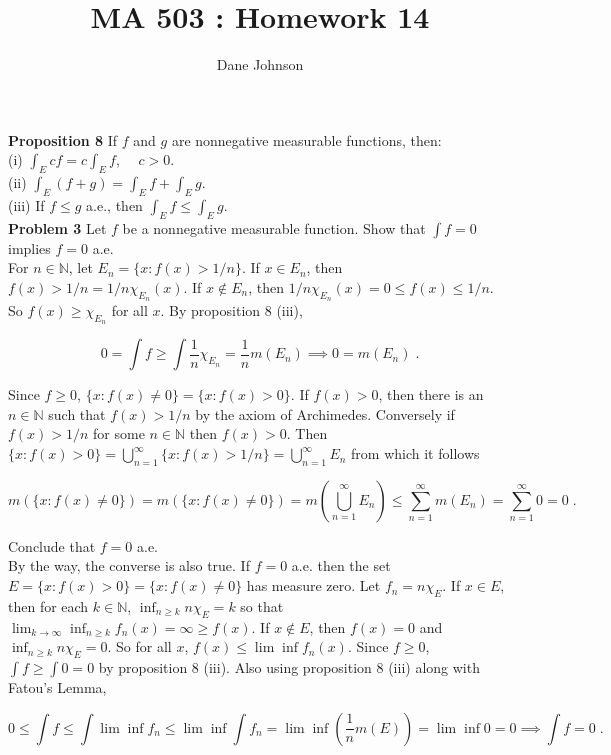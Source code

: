 \documentclass[a4paper]{article}
\title{MA 503 : Homework 14}
\author{Dane Johnson}
\begin{document}
\maketitle


{\bf Proposition 8} If $f$ and $g$ are nonnegative measurable functions, then:\\

(i)  $\int_E cf = c\int_E f$, $\quad c>0$. \\

(ii) $\int_E (f+g) = \int_E f + \int_E g$.\\

(iii) If $f \leq g$ a.e., then $\int_E f \leq \int_E g$. \\


{\bf Problem 3} Let $f$ be a nonnegative measurable function. Show that $\int f = 0$ implies $f = 0$ a.e. \\

For $n \in \mathbb{N}$, let $E_n = \{x : f(x) > 1/n\}$. If $x \in E_n$, then $f(x) > 1/n = 1/n \chi_{E_n}(x)$. If $x \not \in E_n$, then $1/n\chi_{E_n}(x)= 0  \leq f(x) \leq 1/n$. So $f(x) \geq \chi_{E_n}$ for all $x$. By proposition 8 (iii),

$$ 0 = \int f \geq \int \frac{1}{n}\chi_{E_n} = \frac{1}{n}m(E_n) \implies 0 = m(E_n) \;.$$

Since $f \geq 0$, $\{x : f(x) \neq 0 \} = \{x : f(x) > 0\}$. If $f(x) > 0$, then there is an $n\in \mathbb{N}$ such that $f(x) > 1/n$ by the axiom of Archimedes. Conversely if $f(x) > 1/n$ for some $n \in \mathbb{N}$ then $f(x) > 0 $. Then $\{x : f(x) > 0 \} = \bigcup_{n=1}^\infty \{x : f(x) > 1/n\} = \bigcup_{n=1}^\infty E_n$ from which it follows

$$m\left(\{x : f(x) \neq 0\}\right) = m\left(\{x : f(x) \neq 0\}\right) = m\left(\bigcup_{n=1}^\infty E_n \right) \leq \sum_{n=1}^\infty m(E_n)  = \sum_{n=1}^\infty 0 = 0 \;.$$

Conclude that $f = 0$ a.e.\\

By the way, the converse is also true. If $f = 0$ a.e. then the set $E = \{x : f(x) > 0 \} = \{x : f(x) \neq 0\}$ has measure zero. Let $f_n = n \chi_{E}$. If $x \in E$, then for each $k \in \mathbb{N}$, $\inf_{n\geq k} n \chi_E = k$ so that $\lim_{k\rightarrow \infty} \inf_{n\geq k} f_n(x) = \infty \geq f(x)$. If $x \not \in E$, then $f(x) = 0$ and $\inf_{n\geq k} n\chi_E = 0$. So for all $x$, $f(x) \leq \lim \inf f_n(x)$. Since $f \geq 0$, $\int f \geq \int 0 = 0$ by proposition 8 (iii). Also using proposition 8 (iii) along with Fatou's Lemma,

$$0 \leq \int f \leq \int \lim \inf f_n \leq \lim \inf \int f_n = \lim \inf \left(\frac{1}{n} m(E)\right) = \lim \inf 0 = 0 \implies \int f = 0 \;.$$
\end{document}
